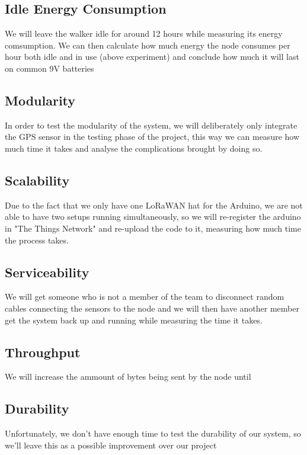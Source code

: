 	\subsection{Idle Energy Consumption}
		We will leave the walker idle for around 12 hours while measuring its energy comsumption.
		We can then calculate how much energy the node consumes per hour both idle and in use (above experiment) and conclude how much it will last on common 9V batteries

	\subsection{Modularity}
		In order to test the modularity of the system, we will deliberately only integrate the GPS sensor in the testing phase of the project, this way we can measure how much time it takes and analyse the complications brought by doing so.

	\subsection{Scalability}
		Due to the fact that we only have one LoRaWAN hat for the Arduino, we are not able to have two setups running simultaneously, so we will re-register the arduino in "The Things Network" and re-upload the code to it, measuring how much time the process takes.

	\subsection{Serviceability}
		We will get someone who is not a member of the team to disconnect random cables connecting the sensors to the node and we will then have another member get the system back up and running while measuring the time it takes.

	\subsection{Throughput}
		We will increase the ammount of bytes being sent by the node until 

	\subsection{Durability}
		Unfortunately, we don’t have enough time to test the durability of our system, so we’ll leave this as a possible improvement over our project



